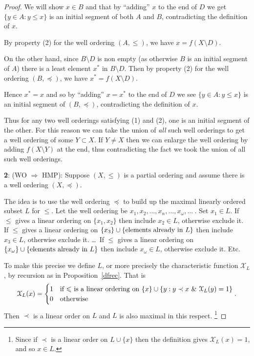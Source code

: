 \documentclass[a4paper]{amsart}
\theoremstyle{plain}
\theoremstyle{definition}
\theoremstyle{remark}
\begin{document}
\begin{proof}
 We will show $ x \in B $ and that by ``adding'' $ x $ to the end of $ D $ we get  $ \{y\in A : y\leqslant x \} $ is an initial segment of both $ A $ and $ B $, contradicting the definition of $ x $.
 
\smallskip  By property (2) for the well ordering $ (A,\leqslant) $,  we have $ x = f (X\setminus D) $.  
 
 On the other hand, since $ B\setminus D  $ is non empty (as otherwise $ B $ is an initial segment of $ A $) there is a least element $ x^* $ in $ B\setminus D  $.  Then  by property (2) for the well ordering $(B, \preccurlyeq)$,  we have $ x^* = f (X\setminus D) $. 
 
 Hence $ x^*=x $ and so by ``adding'' $ x = x^* $ to the end of $ D $ we see $ \{y\in A : y\leqslant x \} $ is an initial segment of $ (B, \preccurlyeq) $, contradicting the definition of $ x $.
 
 \smallskip Thus for any two well orderings   satisfying (1) and (2), one is an initial segment of the other.  For this reason we can take the union of \emph{all}  such well orderings to get a well ordering of some   $Y \subset  X $.  If $ Y \neq X $ then we can enlarge the well ordering by adding $ f(X\setminus Y ) $ at the end, thus contradicting the fact we took the union of all such well orderings.
 
\medskip
\textbf{2}: \noindent (WO $ \Longrightarrow$  HMP):  Suppose $ (X,\leqslant) $ is a partial  ordering and assume there is a well ordering  $(X, \preccurlyeq) $. 

The idea is to use the well ordering $ \preccurlyeq $ to build up the maximal linearly ordered subset  $ L $ for $ \leqslant $.  Let the well ordering be $ x_1, x_2, \dots, x_n, \dots, x_\omega, \dots\ $.  
Set  $ x_1 \in L $.  If $ \leqslant $ gives a linear ordering on $ \{x_1,x_2\} $ then include $ x_2 \in L $, otherwise exclude it.  If  $ \leqslant $ gives a linear ordering on $ \{x_3\} \cup \{\text{elements already in $ L $}\} $ then include $ x_3 \in L $, otherwise exclude it.  \dots \ If $ \leqslant $ gives a linear ordering on $ \{x_\omega\} \cup \{\text{elements already in $ L $}\} $ then include $ x_\omega \in L $, otherwise exclude it. Etc.

To make this precise we define $ L $, or more precisely the characteristic function $\mathcal{X}_L $,  by recursion as in Proposition~\ref{dfrec}.    That is
\[
\mathcal{X}_L(x)  = \begin{cases} 
                              1 & \text{if $ \leqslant $ is a linear ordering on $ \{ x \} \cup
                                                   \{y: y  \prec x \ \& \ \mathcal{X}_L(y) = 1\}$} \\
                               0 & \text{otherwise}
                               \end{cases}.
\]
Then $ \prec $ is a linear order on $ L $ and $ L $ is also maximal in this respect.%
\footnote{Since if $ \prec $ is a linear order on $ L\cup\{x\} $ then the definition gives $ \mathcal{X}_L(x) = 1 $, and so $ x \in L $.}
 


\end{proof}
\end{document}
